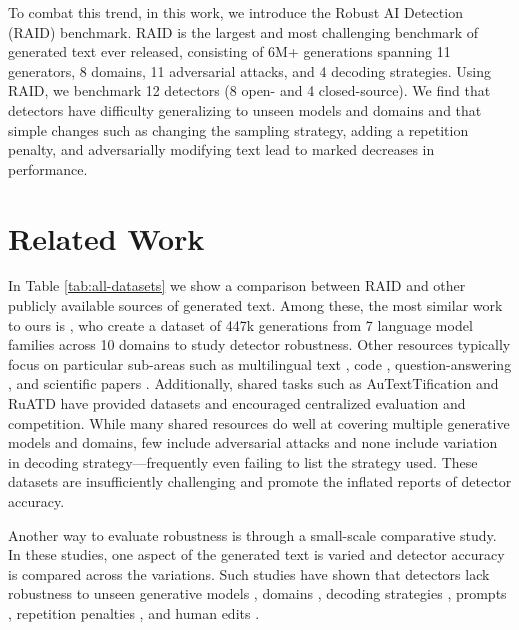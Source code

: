 \documentclass[11pt]{article}
\begin{document}
To combat this trend, in this work, we introduce the Robust AI Detection (RAID) benchmark. RAID is the largest and most challenging benchmark of generated text ever released, consisting of 6M+ generations spanning 11 generators, 8 domains, 11 adversarial attacks, and 4 decoding strategies. Using RAID, we benchmark 12 detectors (8 open- and 4 closed-source). We find that detectors have difficulty generalizing to unseen models and domains and that simple changes such as changing the sampling strategy, adding a repetition penalty, and adversarially modifying text lead to marked decreases in performance.

\section{Related Work}
In Table \ref{tab:all-datasets} we show a comparison between RAID and other publicly available sources of generated text. Among these, the most similar work to ours is \citet{li2024mage}, who create a dataset of 447k generations from 7 language model families across 10 domains to study detector robustness. Other resources typically focus on particular sub-areas such as multilingual text \cite{macko-etal-2023-multitude,wang2023m4}, code \cite{wang2023evaluating}, question-answering \cite{guo2023close,xu2023generalization,su2024hc3}, and scientific papers \cite{mosca-etal-2023-distinguishing}. Additionally, shared tasks such as AuTextTification \cite{sarvazyan2023overview} and RuATD \cite{Shamardina_2022} have provided datasets and encouraged centralized evaluation and competition. %
While many shared resources do well at covering multiple generative models and domains, few include adversarial attacks and none include variation in decoding strategy---frequently even failing to list the strategy used. These datasets are insufficiently challenging and promote the inflated reports of detector accuracy. 

Another way to evaluate robustness is through a small-scale comparative study. In these studies, one aspect of the generated text is varied and detector accuracy is compared across the variations. Such studies have shown that detectors lack robustness to unseen generative models \cite{stiff-and-johansson-2022,xiaopu2023zeroshot,chakraborty-etal-2023-counter}, domains \cite{pagnoni-etal-2022-threat,pu-etal-2023-deepfake,rodriguez-etal-2022-cross}, decoding strategies \cite{ippolito-etal-2020-automatic,solaiman-etal-2019}, prompts \cite{koike2023prompt,kumarage2023reliable,lu2023large}, repetition penalties \cite{fishchuk2023efficient}, and human edits \cite{gao2024llmasacoauthor}. 
\end{document}
